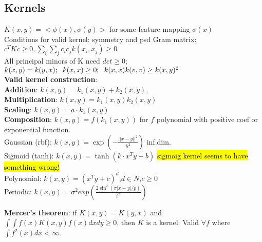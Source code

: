 \subsection*{Kernels}
	$K(x, y) = <\phi(x), \phi(y)>$ for some feature mapping $\phi(x)$\\
	Conditions for valid kernel: symmetry and psd Gram matrix: $c^TKc \geq 0, \sum_i\sum_jc_ic_jk(x_i,x_j)\geq 0$\\
    All principal minors of K need $det \geq 0$;\newline
	$k(x, y) = k(y, x) ;\hspace{2mm} k(x,x) \geq 0;\hspace{2mm} k(x,x)k(v,v) \geq k(x,y)^2$\\
    \textbf{Valid kernel construction}:\\
    \textbf{Addition}: $k(x,y) = k_1(x,y) + k_2(x,y)$,\\
    \textbf{Multiplication}: $k(x,y) = k_1(x,y)k_2(x,y)$\\
    \textbf{Scaling}: $k(x,y) = a\cdot k_1(x,y)$\\
    \textbf{Composition}: $k(x,y) =f(k_1(x,y))$ for $f$ polynomial with positive coef or exponential function.\\
	Gaussian (rbf): $k(x,y) = \exp( -\tfrac{||x-y||^2}{h^2})$ {\tiny inf.dim.}\\
	Sigmoid (tanh): $k(x,y) = \tanh(k\cdot x^Ty - b)$ {\tiny{}} \hl{sigmoig kernel seems to have something wrong!} \\
	Polynomial: $k(x,y) {=} (x^Ty {+} c)^d$,$d\in N$,$c\geq0$ \\
	Periodic: $k(x,y) = \sigma ^2 exp(\frac{2\sin ^2 (\pi |x-y|/p)}{\ell ^2})$
	
    \textbf{Mercer's theorem}: if $K(x,y)=K(y,x)$ and $\int\int f(x)K(x,y)f(x)dx dy\geq0$, then $K$ is a kernel. Valid $\forall f$ where $\int f^2(x)dx<\infty$.


